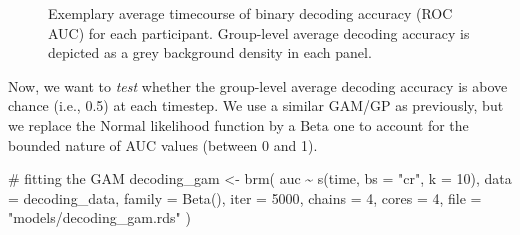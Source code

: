 \documentclass[
  doc,
  floatsintext,
  longtable,
  a4paper,
  nolmodern,
  notxfonts,
  notimes,
  colorlinks=true,linkcolor=blue,citecolor=blue,urlcolor=blue]{apa7}
\newenvironment{Shaded}{\begin{snugshade}}{\end{snugshade}}
\newcommand{\AttributeTok}[1]{\textcolor[rgb]{0.40,0.45,0.13}{#1}}
\newcommand{\CommentTok}[1]{\textcolor[rgb]{0.37,0.37,0.37}{#1}}
\newcommand{\DecValTok}[1]{\textcolor[rgb]{0.68,0.00,0.00}{#1}}
\newcommand{\FunctionTok}[1]{\textcolor[rgb]{0.28,0.35,0.67}{#1}}
\newcommand{\NormalTok}[1]{\textcolor[rgb]{0.00,0.23,0.31}{#1}}
\newcommand{\OtherTok}[1]{\textcolor[rgb]{0.00,0.23,0.31}{#1}}
\newcommand{\SpecialCharTok}[1]{\textcolor[rgb]{0.37,0.37,0.37}{#1}}
\newcommand{\StringTok}[1]{\textcolor[rgb]{0.13,0.47,0.30}{#1}}
\begin{document}
\begin{figure}[!htb]

\caption{\label{fig-mne-decoding}Exemplary average timecourse of binary
decoding accuracy (ROC AUC) for each participant. Group-level average
decoding accuracy is depicted as a grey background density in each
panel.}


\end{figure}%

Now, we want to \emph{test} whether the group-level average decoding
accuracy is above chance (i.e., 0.5) at each timestep. We use a similar
GAM/GP as previously, but we replace the \(\mathrm{Normal}\) likelihood
function by a \(\mathrm{Beta}\) one to account for the bounded nature of
AUC values (between 0 and 1).

\begin{Shaded}
\begin{Highlighting}[]
\CommentTok{\# fitting the GAM}
\NormalTok{decoding\_gam }\OtherTok{\textless{}{-}} \FunctionTok{brm}\NormalTok{(}
\NormalTok{    auc }\SpecialCharTok{\textasciitilde{}} \FunctionTok{s}\NormalTok{(time, }\AttributeTok{bs =} \StringTok{"cr"}\NormalTok{, }\AttributeTok{k =} \DecValTok{10}\NormalTok{),}
    \AttributeTok{data =}\NormalTok{ decoding\_data,}
    \AttributeTok{family =} \FunctionTok{Beta}\NormalTok{(),}
    \AttributeTok{iter =} \DecValTok{5000}\NormalTok{,}
    \AttributeTok{chains =} \DecValTok{4}\NormalTok{,}
    \AttributeTok{cores =} \DecValTok{4}\NormalTok{,}
    \AttributeTok{file =} \StringTok{"models/decoding\_gam.rds"}
\NormalTok{    )}
\end{Highlighting}
\end{Shaded}
\end{document}
